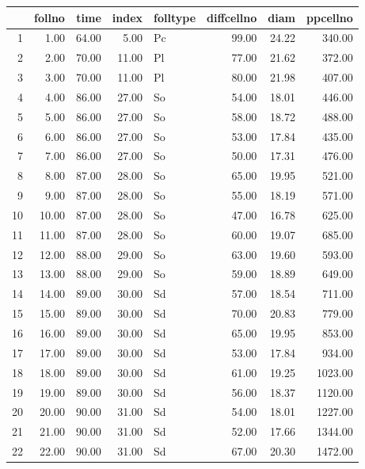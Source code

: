 \documentclass{article}
\begin{document}
\begin{table}[ht]
\centering
\begin{tabular}{rrrrlrrr}
  \hline
 & follno & time & index & folltype & diffcellno & diam & ppcellno \\ 
  \hline
1 & 1.00 & 64.00 & 5.00 & Pc & 99.00 & 24.22 & 340.00 \\ 
  2 & 2.00 & 70.00 & 11.00 & Pl & 77.00 & 21.62 & 372.00 \\ 
  3 & 3.00 & 70.00 & 11.00 & Pl & 80.00 & 21.98 & 407.00 \\ 
  4 & 4.00 & 86.00 & 27.00 & So & 54.00 & 18.01 & 446.00 \\ 
  5 & 5.00 & 86.00 & 27.00 & So & 58.00 & 18.72 & 488.00 \\ 
  6 & 6.00 & 86.00 & 27.00 & So & 53.00 & 17.84 & 435.00 \\ 
  7 & 7.00 & 86.00 & 27.00 & So & 50.00 & 17.31 & 476.00 \\ 
  8 & 8.00 & 87.00 & 28.00 & So & 65.00 & 19.95 & 521.00 \\ 
  9 & 9.00 & 87.00 & 28.00 & So & 55.00 & 18.19 & 571.00 \\ 
  10 & 10.00 & 87.00 & 28.00 & So & 47.00 & 16.78 & 625.00 \\ 
  11 & 11.00 & 87.00 & 28.00 & So & 60.00 & 19.07 & 685.00 \\ 
  12 & 12.00 & 88.00 & 29.00 & So & 63.00 & 19.60 & 593.00 \\ 
  13 & 13.00 & 88.00 & 29.00 & So & 59.00 & 18.89 & 649.00 \\ 
  14 & 14.00 & 89.00 & 30.00 & Sd & 57.00 & 18.54 & 711.00 \\ 
  15 & 15.00 & 89.00 & 30.00 & Sd & 70.00 & 20.83 & 779.00 \\ 
  16 & 16.00 & 89.00 & 30.00 & Sd & 65.00 & 19.95 & 853.00 \\ 
  17 & 17.00 & 89.00 & 30.00 & Sd & 53.00 & 17.84 & 934.00 \\ 
  18 & 18.00 & 89.00 & 30.00 & Sd & 61.00 & 19.25 & 1023.00 \\ 
  19 & 19.00 & 89.00 & 30.00 & Sd & 56.00 & 18.37 & 1120.00 \\ 
  20 & 20.00 & 90.00 & 31.00 & Sd & 54.00 & 18.01 & 1227.00 \\ 
  21 & 21.00 & 90.00 & 31.00 & Sd & 52.00 & 17.66 & 1344.00 \\ 
  22 & 22.00 & 90.00 & 31.00 & Sd & 67.00 & 20.30 & 1472.00 \\ 

\end{tabular}
\end{table}
\end{document}
